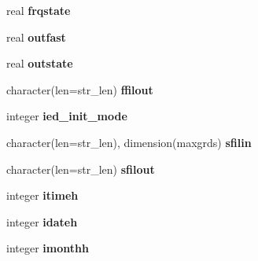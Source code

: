 \begin{DoxyCompactItemize}
\item 
\hypertarget{structename__coms_1_1ename__vars_ac253aad0f5ce409e905ec9fa0e502ece}{
real {\bfseries frqstate}}
\label{structename__coms_1_1ename__vars_ac253aad0f5ce409e905ec9fa0e502ece}

\item 
\hypertarget{structename__coms_1_1ename__vars_a077ce688efd456c87c6c795cc22a7740}{
real {\bfseries outfast}}
\label{structename__coms_1_1ename__vars_a077ce688efd456c87c6c795cc22a7740}

\item 
\hypertarget{structename__coms_1_1ename__vars_aa50950a646209be585ff2938fde9edcf}{
real {\bfseries outstate}}
\label{structename__coms_1_1ename__vars_aa50950a646209be585ff2938fde9edcf}

\item 
\hypertarget{structename__coms_1_1ename__vars_a435668b7df87c4c3b26a91c32f46a781}{
character(len=str\_\-len) {\bfseries ffilout}}
\label{structename__coms_1_1ename__vars_a435668b7df87c4c3b26a91c32f46a781}

\item 
\hypertarget{structename__coms_1_1ename__vars_aab79eabd9208f4c84290572f7ee4c1e9}{
integer {\bfseries ied\_\-init\_\-mode}}
\label{structename__coms_1_1ename__vars_aab79eabd9208f4c84290572f7ee4c1e9}

\item 
\hypertarget{structename__coms_1_1ename__vars_a7d118d70c31a2b62ba30943989d9d832}{
character(len=str\_\-len), dimension(maxgrds) {\bfseries sfilin}}
\label{structename__coms_1_1ename__vars_a7d118d70c31a2b62ba30943989d9d832}

\item 
\hypertarget{structename__coms_1_1ename__vars_a88267d1c2a655cba72220200c9309fec}{
character(len=str\_\-len) {\bfseries sfilout}}
\label{structename__coms_1_1ename__vars_a88267d1c2a655cba72220200c9309fec}

\item 
\hypertarget{structename__coms_1_1ename__vars_aeb4babbd3641a5db49f5cedd66ab75f1}{
integer {\bfseries itimeh}}
\label{structename__coms_1_1ename__vars_aeb4babbd3641a5db49f5cedd66ab75f1}

\item 
\hypertarget{structename__coms_1_1ename__vars_ab762a13a2d0d886ecb90c48121b426e1}{
integer {\bfseries idateh}}
\label{structename__coms_1_1ename__vars_ab762a13a2d0d886ecb90c48121b426e1}

\item 
\hypertarget{structename__coms_1_1ename__vars_a8e815c0fae64b7126baceed75ce5684c}{
integer {\bfseries imonthh}}
\label{structename__coms_1_1ename__vars_a8e815c0fae64b7126baceed75ce5684c}


\end{DoxyCompactItemize}
